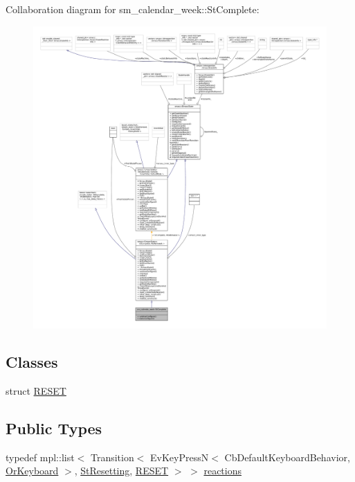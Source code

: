 Collaboration diagram for sm\+\_\+calendar\+\_\+week\+:\+:St\+Complete\+:
\nopagebreak
\begin{figure}[H]
\begin{center}
\leavevmode
\includegraphics[width=350pt]{structsm__calendar__week_1_1StComplete__coll__graph}
\end{center}
\end{figure}
\subsection*{Classes}
\begin{DoxyCompactItemize}
\item 
struct \hyperlink{structsm__calendar__week_1_1StComplete_1_1RESET}{R\+E\+S\+ET}
\end{DoxyCompactItemize}
\subsection*{Public Types}
\begin{DoxyCompactItemize}
\item 
typedef mpl\+::list$<$ Transition$<$ Ev\+Key\+PressN$<$ Cb\+Default\+Keyboard\+Behavior, \hyperlink{classsm__calendar__week_1_1OrKeyboard}{Or\+Keyboard} $>$, \hyperlink{structsm__calendar__week_1_1StResetting}{St\+Resetting}, \hyperlink{structsm__calendar__week_1_1StComplete_1_1RESET}{R\+E\+S\+ET} $>$ $>$ \hyperlink{structsm__calendar__week_1_1StComplete_a6fb0af1c68075a3b6475ed252e6bfc4c}{reactions}
\end{DoxyCompactItemize}

